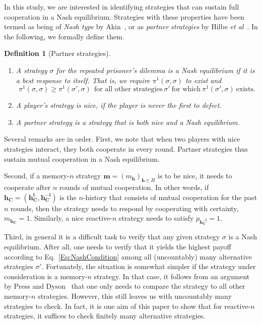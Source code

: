 \documentclass[11pt]{article}
\theoremstyle{plainCl1}
\theoremstyle{plainCl2}
\newtheorem*{definition}{Definition}
\begin{document}
In this study, we are interested in identifying strategies that can sustain full cooperation in a Nash equilibrium. 
Strategies with these properties have been termed as being of {\it Nash type} by Akin~\citep{akin:EGADS:2016}, or as {\it partner strategies} by Hilbe {\it et al}~\citep{Hilbe:GEB:2015}. 
In the following, we formally define them. 

\begin{definition}[Partner strategies]
~\\[-1cm]
{
\renewcommand\labelenumi{(\roman{enumi})}
\begin{enumerate}[noitemsep,topsep=0pt]
\item A strategy $\sigma$ for the repeated prisoner's dilemma is a {\it Nash equilibrium} if it is a best response to itself. 
That is, we require $\pi^1(\sigma,\sigma)$ to exist and
\begin{equation} \label{Eq:NashCondition}
\pi^1(\sigma,\sigma) \!\ge\! \pi^1(\sigma',\sigma) ~~\text{for all other strategies}~\sigma'~\text{for which}~ \pi^1(\sigma',\sigma)~\text{exists}. 
\end{equation}
\item A player's strategy is \textit{nice}, if the player is never the first to defect. 
\item A \textit{partner strategy} is a strategy that is both nice and a Nash equilibrium.
\end{enumerate}
}
\end{definition}

\noindent
Several remarks are in order. First, we note that when two players with nice strategies interact, they both cooperate in every round. Partner strategies thus sustain mutual cooperation in a Nash equilibrium. 

Second, if a memory-$n$ strategy $\mathbf{m}\!=\!(m_\mathbf{h})_{\mathbf{h}\in H}$ is to be nice, it needs to cooperate after $n$ rounds of mutual cooperation. In other words, if $\mathbf{h_C} \!=\! (\mathbf{h^i_C},\mathbf{h^{-i}_C})$ is the $n$-history that consists of mutual cooperation for the past $n$ rounds, then the strategy needs to respond by cooperating with certainty, $m_\mathbf{h_C}\!=\!1$.  Similarly, a nice reactive-$n$ strategy needs to satisfy $p_\mathbf{h^{-i}_C}\!=\!1$. 

Third, in general it is a difficult task to verify that any given strategy $\sigma$ is a Nash equilibrium. 
After all, one needs to verify that it yields the highest payoff according to Eq.~\eqref{Eq:NashCondition} among all (uncountably) many alternative strategies $\sigma'$. 
Fortunately, the situation is somewhat simpler if the strategy under consideration is a memory-$n$ strategy. 
In that case, it follows from an argument by Press and Dyson~\cite{press:PNAS:2012}  that one only needs to compare the strategy to all other memory-$n$ strategies. 
However, this still leaves us with uncountably many strategies to check. 
In fact, it is one aim of this paper to show that for reactive-$n$ strategies, it suffices to check finitely many alternative strategies. 
\end{document}
